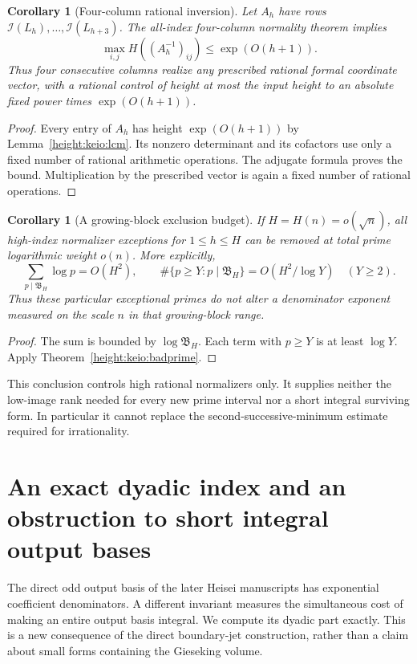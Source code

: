 \documentclass[11pt,a4paper]{article}
\numberwithin{equation}{section}
\newtheorem{corollary}[theorem]{Corollary}
\theoremstyle{definition}\newtheorem{definition}[theorem]{Definition}
\theoremstyle{remark}\newtheorem{remark}[theorem]{Remark}
\begin{document}
\begin{corollary}[Four-column rational inversion]
\label{height:keio:fourinverse}
Let $A_h$ have rows $\mathcal I(L_h),\ldots,\mathcal I(L_{h+3})$.
The all-index four-column normality theorem implies
\[
 \max_{i,j} H((A_h^{-1})_{ij})\le\exp(O(h+1)).
\]
Thus four consecutive columns realize any prescribed rational formal
coordinate vector, with a rational control of height at most the input
height to an absolute fixed power times $\exp(O(h+1))$.
\end{corollary}
\begin{proof}
Every entry of $A_h$ has height $\exp(O(h+1))$ by
Lemma~\ref{height:keio:lcm}. Its nonzero determinant and its cofactors use
only a fixed number of rational arithmetic operations. The adjugate
formula proves the bound. Multiplication by the prescribed vector is
again a fixed number of rational operations.
\end{proof}

\begin{corollary}[A growing-block exclusion budget]\label{height:keio:growing}
If $H=H(n)=o(\sqrt n)$, all high-index normalizer exceptions for
$1\le h\le H$ can be removed at total prime logarithmic weight
$o(n)$. More explicitly,
\[
 \sum_{p\mid\mathfrak B_H}\log p=O(H^2),\qquad
 \#\{p\ge Y:p\mid\mathfrak B_H\}
                  =O(H^2/\log Y)\quad(Y\ge2).
\]
Thus these particular exceptional primes do not alter a denominator
exponent measured on the scale $n$ in that growing-block range.
\end{corollary}
\begin{proof}
The sum is bounded by $\log\mathfrak B_H$. Each term with $p\ge Y$
is at least $\log Y$. Apply Theorem~\ref{height:keio:badprime}.
\end{proof}

This conclusion controls high rational normalizers only. It supplies
neither the low-image rank needed for every new prime interval nor a
short integral surviving form. In particular it cannot replace the
second-successive-minimum estimate required for irrationality.


\section{An exact dyadic index and an obstruction to short integral output bases}
\label{odd:hs:sec}

The direct odd output basis of the later Heisei manuscripts has exponential
coefficient denominators. A different invariant measures the simultaneous cost
of making an entire output basis integral. We compute its dyadic part exactly.
This is a new consequence of the direct boundary-jet construction, rather than
a claim about small forms containing the Gieseking volume.
\end{document}
